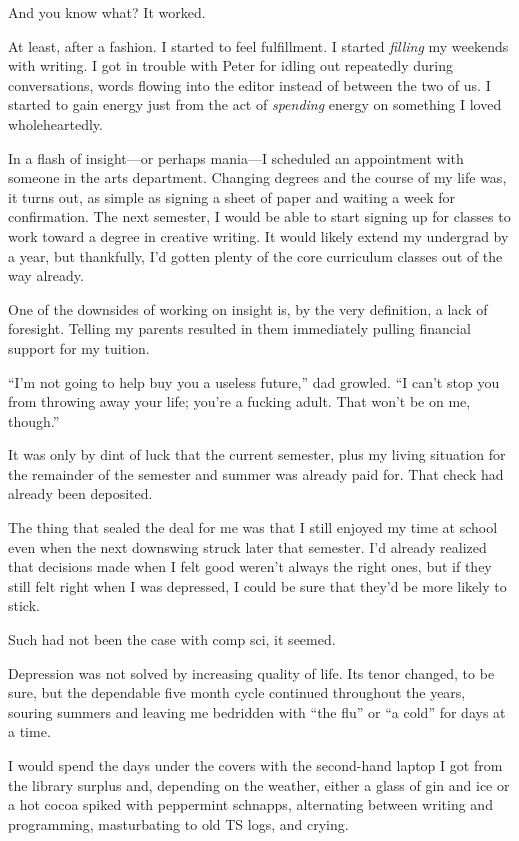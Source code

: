 And you know what? It worked.

At least, after a fashion. I started to feel fulfillment. I started \emph{filling} my weekends with writing. I got in trouble with Peter for idling out repeatedly during conversations, words flowing into the editor instead of between the two of us. I started to gain energy just from the act of \emph{spending} energy on something I loved wholeheartedly.

In a flash of insight---or perhaps mania---I scheduled an appointment with someone in the arts department. Changing degrees and the course of my life was, it turns out, as simple as signing a sheet of paper and waiting a week for confirmation. The next semester, I would be able to start signing up for classes to work toward a degree in creative writing. It would likely extend my undergrad by a year, but thankfully, I'd gotten plenty of the core curriculum classes out of the way already.

One of the downsides of working on insight is, by the very definition, a lack of foresight. Telling my parents resulted in them immediately pulling financial support for my tuition.

``I'm not going to help buy you a useless future,'' dad growled. ``I can't stop you from throwing away your life; you're a fucking adult. That won't be on me, though.''

It was only by dint of luck that the current semester, plus my living situation for the remainder of the semester and summer was already paid for. That check had already been deposited.

The thing that sealed the deal for me was that I still enjoyed my time at school even when the next downswing struck later that semester. I'd already realized that decisions made when I felt good weren't always the right ones, but if they still felt right when I was depressed, I could be sure that they'd be more likely to stick.

Such had not been the case with comp sci, it seemed.

Depression was not solved by increasing quality of life. Its tenor changed, to be sure, but the dependable five month cycle continued throughout the years, souring summers and leaving me bedridden with ``the flu'' or ``a cold'' for days at a time.

I would spend the days under the covers with the second-hand laptop I got from the library surplus and, depending on the weather, either a glass of gin and ice or a hot cocoa spiked with peppermint schnapps, alternating between writing and programming, masturbating to old TS logs, and crying.

